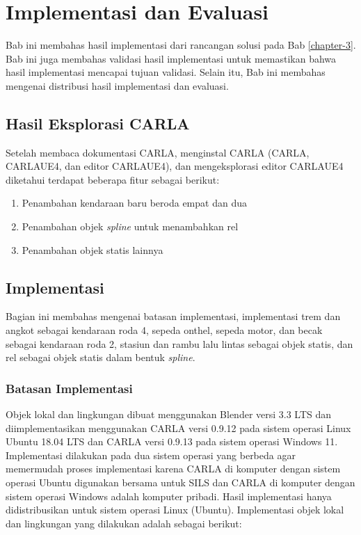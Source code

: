\chapter{Implementasi dan Evaluasi}

Bab ini membahas hasil implementasi dari rancangan solusi pada Bab
\ref{chapter-3}. Bab ini juga membahas validasi hasil implementasi untuk
memastikan bahwa hasil implementasi mencapai tujuan validasi. Selain itu, Bab
ini membahas mengenai distribusi hasil implementasi dan evaluasi.

\section{Hasil Eksplorasi CARLA}

Setelah membaca dokumentasi CARLA, menginstal CARLA (CARLA, CARLAUE4, dan editor
CARLAUE4), dan mengeksplorasi editor CARLAUE4 diketahui terdapat beberapa fitur
sebagai berikut:

\begin{enumerate}
    \item Penambahan kendaraan baru beroda empat dan dua
    \item Penambahan objek \textit{spline} untuk menambahkan rel
    \item Penambahan objek statis lainnya
\end{enumerate}


\section{Implementasi}

Bagian ini membahas mengenai batasan implementasi, implementasi trem dan angkot
sebagai kendaraan roda 4, sepeda onthel, sepeda motor, dan becak sebagai
kendaraan roda 2, stasiun dan rambu lalu lintas sebagai objek statis, dan rel
sebagai objek statis dalam bentuk \textit{spline}.

\subsection{Batasan Implementasi}

Objek lokal dan lingkungan dibuat menggunakan Blender versi 3.3 LTS dan
diimplementasikan menggunakan CARLA versi 0.9.12 pada sistem operasi Linux
Ubuntu 18.04 LTS dan CARLA versi 0.9.13 pada sistem operasi Windows 11.
Implementasi dilakukan pada dua sistem operasi yang berbeda agar memermudah
proses implementasi karena CARLA di komputer dengan sistem operasi Ubuntu
digunakan bersama untuk SILS dan CARLA di komputer dengan sistem operasi Windows
adalah komputer pribadi. Hasil implementasi hanya didistribusikan untuk sistem
operasi Linux (Ubuntu). Implementasi objek lokal dan lingkungan yang dilakukan
adalah sebagai berikut:

